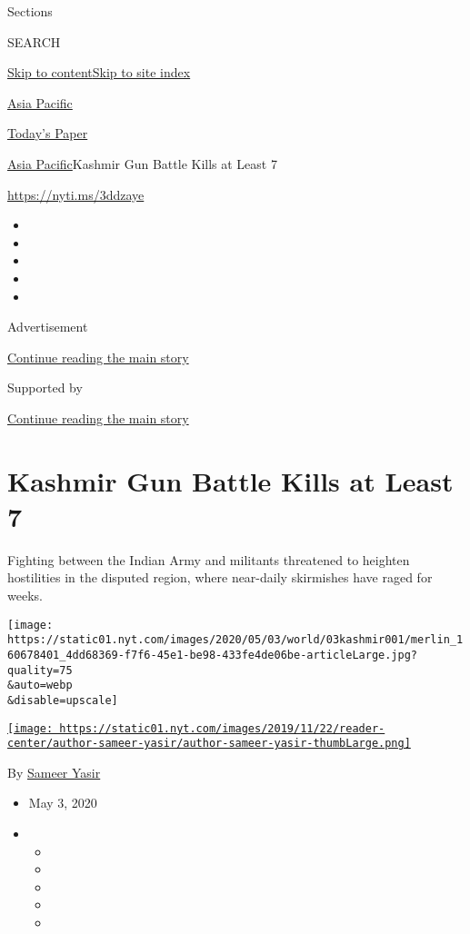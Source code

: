Sections

SEARCH

\protect\hyperlink{site-content}{Skip to
content}\protect\hyperlink{site-index}{Skip to site index}

\href{https://www.nytimes.com/section/world/asia}{Asia Pacific}

\href{https://myaccount.nytimes.com/auth/login?response_type=cookie\&client_id=vi}{}

\href{https://www.nytimes.com/section/todayspaper}{Today's Paper}

\href{/section/world/asia}{Asia Pacific}\textbar{}Kashmir Gun Battle
Kills at Least 7

\url{https://nyti.ms/3ddzaye}

\begin{itemize}
\item
\item
\item
\item
\item
\end{itemize}

Advertisement

\protect\hyperlink{after-top}{Continue reading the main story}

Supported by

\protect\hyperlink{after-sponsor}{Continue reading the main story}

\hypertarget{kashmir-gun-battle-kills-at-least-7}{%
\section{Kashmir Gun Battle Kills at Least
7}\label{kashmir-gun-battle-kills-at-least-7}}

Fighting between the Indian Army and militants threatened to heighten
hostilities in the disputed region, where near-daily skirmishes have
raged for weeks.

\texttt{[image: https://static01.nyt.com/images/2020/05/03/world/03kashmir001/merlin\_160678401\_4dd68369-f7f6-45e1-be98-433fe4de06be-articleLarge.jpg?quality=75\\\&auto=webp\\\&disable=upscale]}

\href{https://www.nytimes.com/by/sameer-yasir}{\texttt{[image: https://static01.nyt.com/images/2019/11/22/reader-center/author-sameer-yasir/author-sameer-yasir-thumbLarge.png]}}

By \href{https://www.nytimes.com/by/sameer-yasir}{Sameer Yasir}

\begin{itemize}
\item
  May 3, 2020
\item
  \begin{itemize}
  \item
  \item
  \item
  \item
  \item
  \end{itemize}
\end{itemize}

